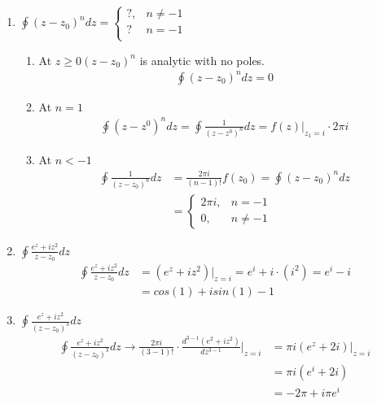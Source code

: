 \documentclass[12pt]{article}
\begin{document}
\begin{enumerate}
\begin{enumerate}
			\item $\oint (z-z_{0})^{n}dz =  
		  \begin{cases} 
          ?, & n \neq -1 \\
          ? & n = -1 \\
  \end{cases} $
  \begin{enumerate}
      \item At $z \geq 0 (z-z_{0})^{n}$ is analytic with no poles.
	      \begin{align*}
	          \oint(z-z_{0})^{n}dz = 0
	      \end{align*}
	\item At $n=1$
		\begin{align*}
			\oint(z-z^{0})^{n}dz=\oint \frac{1}{(z-z^{0})^{n}}dz=f(z)|_{z_{1}=i} \cdot 2\pi i
		\end{align*}
	\item At $n < -1$
		\begin{align*}
			\oint \frac{1}{(z-z_{0})^{n}}dz &= \frac{2\pi i}{(n-1)!}f(z_{0})= \oint(z-z_{0})^{n}dz\\
							&= \begin{cases}
							     {2\pi i}, & {n=-1}\\
							     {0}, & {n \neq -1}
							\end{cases}
		\end{align*}
  \end{enumerate}
  \item $\oint \frac{e^{z}+iz^{2}}{z-z_{0}}dz$
	  \begin{align*}
		  \oint \frac{e^{z}+iz^{2}}{z-z_{0}}dz &= (e^{z}+iz^{2})|_{z=i}=e^{i}+i \cdot (i^{2})=e^{i}-i\\
						       &=cos(1)+isin(1)-1
	  \end{align*}
	  \item $\oint \frac{e^{z}+iz^{2}}{(z-z_{0})^{3}}dz$
		  \begin{align*}
			  \oint \frac{e^{z}+iz^{2}}{(z-z_{0})^{3}}dz \rightarrow \frac{2\pi i}{(3-1)!} \cdot \frac{d^{3-1}(e^{2}+iz^{2})}{dz^{3-1}}|_{z=i} &=\pi i(e^{z}+2i)|_{z=i}\\
			  &=\pi i(e^{i}+2i)\\
			  &=-2\pi +i\pi e^{i}
		  \end{align*}
    

		\end{enumerate}

\end{enumerate}
\end{document}
